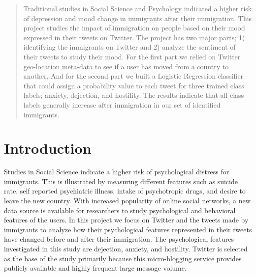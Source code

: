 \documentclass{article}
\begin{document}
 


\begin{abstract} 
Traditional studies in Social Science and Psychology indicated a higher risk of depression and mood change in immigrants after their immigration. This project studies the impact of immigration on people based on their mood expressed in their tweets on Twitter. The project has two major parts; 1) identifying the immigrants on Twitter and 2) analyze the sentiment of their tweets to study their mood. For the first part we relied on Twitter geo-location meta-data to see if a user has moved from a country to another. And for the second part we built a Logistic Regression classifier that could assign a probability value to each tweet for three trained class labels; anxiety, dejection, and hostility. The results indicate that all class labels generally increase after immigration in our set of identified immigrants. 
\end{abstract} 

\section{Introduction}
\label{Introduction}

Studies in Social Science indicate a higher risk of psychological distress for immigrants. This is illustrated by measuring different features such as suicide rate, self reported psychiatric illness, intake of psychotropic drugs, and desire to leave the new country. With increased popularity of online social networks, a new data source is available for researchers to study psychological and behavioral features of the users. In this project we focus on Twitter and the tweets made by immigrants to analyze how their psychological features represented in their tweets have changed before and after their immigration. The psychological features investigated in this study are dejection, anxiety, and hostility. Twitter is selected as the base of the study primarily because this micro-blogging service provides publicly available and highly frequent large message volume. 
\end{document}

